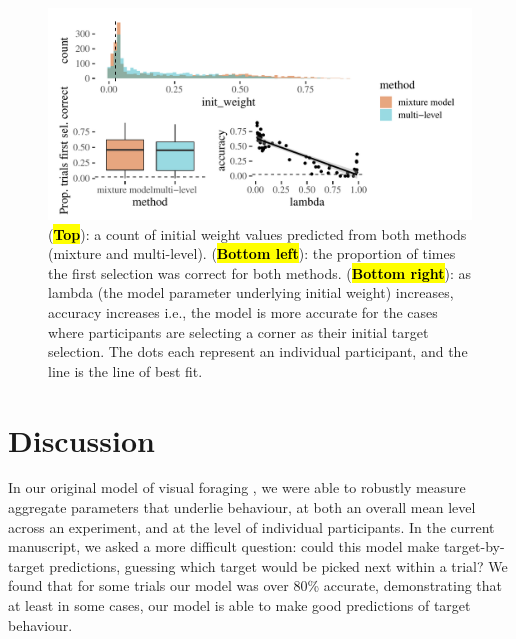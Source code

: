 \documentclass[vision,article,accept,pdftex,moreauthors]{Definitions/mdpi}
\begin{document}
\begin{figure}[H]
\includegraphics[width=13.8 cm]{Figures/qjep_init_sel_preds.pdf}
\caption{({\textbf{\hl{Top}}}): a count of initial weight values predicted from both methods (mixture and multi-level). ({\textbf{\hl{Bottom left}}}): the proportion of times the first selection was correct for both methods.  ({\textbf{\hl{Bottom right}}}): as lambda (the model parameter underlying initial weight) increases, accuracy increases i.e., the model is more accurate for the cases where participants are selecting a corner as their initial target selection. The dots each represent an individual participant, and the line is the line of best fit.}%

\label{fig:qjep_init_sel_pred}
\end{figure} 

\section{Discussion}

In our original model of visual foraging \citep{clarke2022foraging}, we were able to robustly measure aggregate parameters that underlie behaviour, at both an overall mean level across an experiment, and at the level of individual participants. In the current manuscript, we asked a more difficult question: could this model make target-by-target predictions, guessing which target would be picked next within a trial? We found that for some trials our model was over 80\% accurate, demonstrating that at least in some cases, our model is able to make good predictions of target behaviour.
\end{document}
